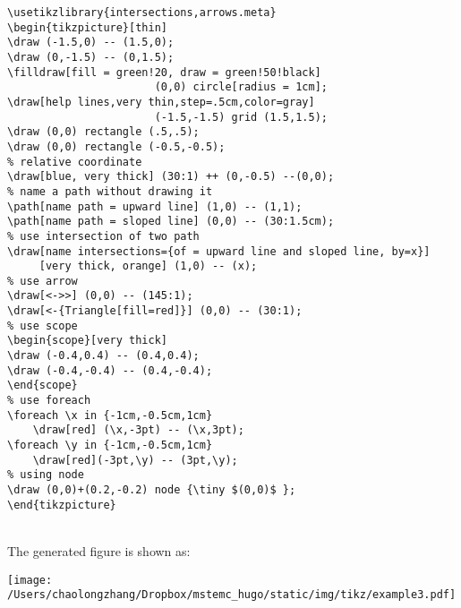 \documentclass[koma,a4paper,utopia,12pt,listings-color,microtype,paralist,colorlinks,urlcolor=red]{org-article}
\begin{document}
\begin{lstlisting}
\usetikzlibrary{intersections,arrows.meta}
\begin{tikzpicture}[thin]
\draw (-1.5,0) -- (1.5,0);
\draw (0,-1.5) -- (0,1.5);
\filldraw[fill = green!20, draw = green!50!black]
                       (0,0) circle[radius = 1cm];
\draw[help lines,very thin,step=.5cm,color=gray]
                       (-1.5,-1.5) grid (1.5,1.5);
\draw (0,0) rectangle (.5,.5);
\draw (0,0) rectangle (-0.5,-0.5);
% relative coordinate
\draw[blue, very thick] (30:1) ++ (0,-0.5) --(0,0);
% name a path without drawing it
\path[name path = upward line] (1,0) -- (1,1);
\path[name path = sloped line] (0,0) -- (30:1.5cm);
% use intersection of two path
\draw[name intersections={of = upward line and sloped line, by=x}]
     [very thick, orange] (1,0) -- (x);
% use arrow
\draw[<->>] (0,0) -- (145:1);
\draw[<-{Triangle[fill=red]}] (0,0) -- (30:1);
% use scope
\begin{scope}[very thick]
\draw (-0.4,0.4) -- (0.4,0.4);
\draw (-0.4,-0.4) -- (0.4,-0.4);
\end{scope}
% use foreach
\foreach \x in {-1cm,-0.5cm,1cm}
    \draw[red] (\x,-3pt) -- (\x,3pt);
\foreach \y in {-1cm,-0.5cm,1cm}
    \draw[red](-3pt,\y) -- (3pt,\y);
% using node
\draw (0,0)+(0.2,-0.2) node {\tiny $(0,0)$ };
\end{tikzpicture}
\end{lstlisting}


\hspace{0pt}\\
The generated figure is shown as:
\begin{center}
\texttt{[image: /Users/chaolongzhang/Dropbox/mstemc\_hugo/static/img/tikz/example3.pdf]}
\end{center}
\end{document}
